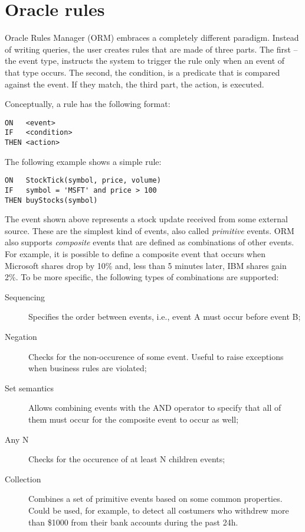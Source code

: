 \documentclass{report}
\begin{document}
\section{Oracle rules}

Oracle Rules Manager (ORM) embraces a completely different paradigm. Instead of writing queries, the user creates rules that are made of three parts. The first -- the event type, instructs the system to trigger the rule only when an event of that type occurs. The second, the condition, is a predicate that is compared against the event. If they match, the third part, the action, is executed.

Conceptually, a rule has the following format:

\begin{verbatim}
ON   <event>
IF   <condition>
THEN <action>
\end{verbatim}

The following example shows a simple rule:

\begin{verbatim}
ON   StockTick(symbol, price, volume)
IF   symbol = 'MSFT' and price > 100
THEN buyStocks(symbol)
\end{verbatim}

The event shown above represents a stock update received from some external source. These are the simplest kind of events, also called \emph{primitive} events. ORM also supports \emph{composite} events that are defined as combinations of other events. For example, it is possible to define a composite event that occurs when Microsoft shares drop by 10\% and, less than 5 minutes later, IBM shares gain 2\%. To be more specific, the following types of combinations are supported:
\begin{description}
\item [Sequencing] Specifies the order between events, i.e., event A must occur before event B;
\item [Negation] Checks for the non-occurence of some event. Useful to raise exceptions when business rules are violated;
\item [Set semantics] Allows combining events with the AND operator to specify that all of them must occur for the composite event to occur as well;
\item [Any N] Checks for the occurence of at least N children events;
\item [Collection] Combines a set of primitive events based on some common properties. Could be used, for example, to detect all costumers who withdrew more than \$1000 from their bank accounts during the past 24h.
\end{description}
\end{document}
